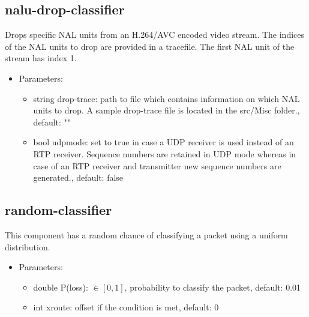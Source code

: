\subsection{nalu-drop-classifier}
Drops specific NAL units from an H.264/AVC encoded video stream. The indices of the NAL units to drop are provided in a tracefile. The first NAL unit of the stream has index 1.
\begin{itemize}
\item Parameters:
\begin{itemize}
\item string drop-trace: path to file which contains information on which NAL units to drop. A sample drop-trace file is located in the src/Misc folder., default: ""
\item bool udpmode: set to true in case a UDP receiver is used instead of an RTP receiver. Sequence numbers are retained in UDP mode whereas in case of an RTP receiver and transmitter new sequence numbers are generated., default: false
\end{itemize}
\end{itemize}
\subsection{random-classifier}
This component has a random chance of classifying a packet using a uniform distribution.
\begin{itemize}
\item Parameters:
\begin{itemize}
\item double P(loss): $\in[0,1]$, probability to classify the packet, default: 0.01
\item int xroute: offset if the condition is met, default: 0
\end{itemize}
\end{itemize}
